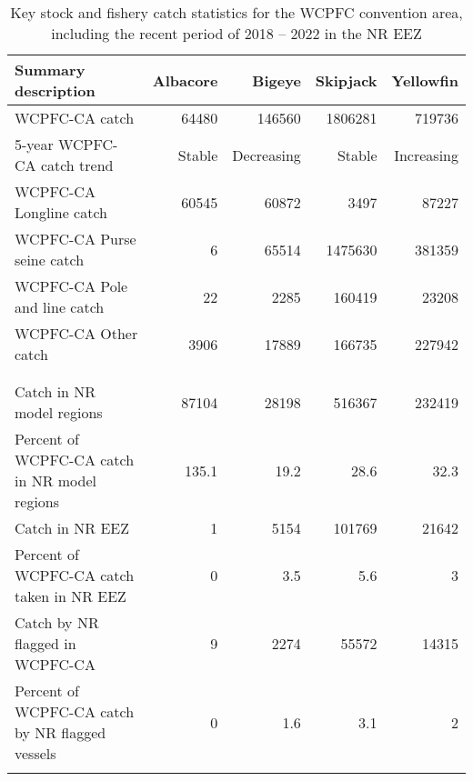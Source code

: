 \begin{longtable}{lrrrr}
\caption{Key stock and fishery catch statistics for the WCPFC convention area, including the recent period of 2018 -- 2022 in the NR EEZ} \\ 
  \hline
Summary description & Albacore & Bigeye & Skipjack & Yellowfin \\ 
  \hline
WCPFC-CA catch & 64480 & 146560 & 1806281 & 719736 \\ 
  5-year WCPFC-CA catch trend & Stable & Decreasing & Stable & Increasing \\ 
  WCPFC-CA Longline catch & 60545 & 60872 & 3497 & 87227 \\ 
  WCPFC-CA Purse seine catch & 6 & 65514 & 1475630 & 381359 \\ 
  WCPFC-CA Pole and line catch & 22 & 2285 & 160419 & 23208 \\ 
  WCPFC-CA Other catch & 3906 & 17889 & 166735 & 227942 \\ 
   &  &  &  &  \\ 
   \hline
 &  &  &  &  \\ 
  Catch in NR model regions & 87104 & 28198 & 516367 & 232419 \\ 
  Percent of WCPFC-CA catch in NR model regions & 135.1 & 19.2 & 28.6 & 32.3 \\ 
  Catch in NR EEZ & 1 & 5154 & 101769 & 21642 \\ 
  Percent of WCPFC-CA catch taken in NR EEZ & 0 & 3.5 & 5.6 & 3 \\ 
  Catch by NR flagged in WCPFC-CA & 9 & 2274 & 55572 & 14315 \\ 
  Percent of WCPFC-CA catch by NR flagged vessels & 0 & 1.6 & 3.1 & 2 \\ 
  \hline
\label{cat_sum_tab}
\end{longtable}
